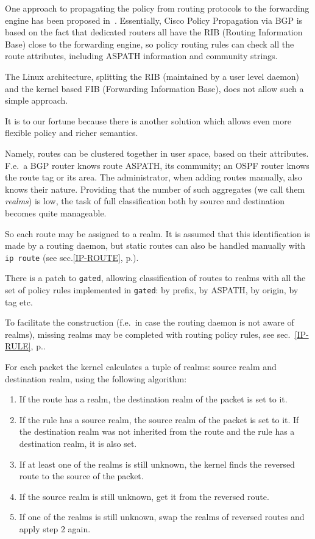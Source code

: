 One approach to propagating the policy from routing protocols
to the forwarding engine has been proposed in~\cite{IOS-BGP-PP}.
Essentially, Cisco Policy Propagation via BGP is based on the fact
that dedicated routers all have the RIB (Routing Information Base)
close to the forwarding engine, so policy routing rules can
check all the route attributes, including ASPATH information
and community strings.

The Linux architecture, splitting the RIB (maintained by a user level
daemon) and the kernel based FIB (Forwarding Information Base),
does not allow such a simple approach.

It is to our fortune because there is another solution
which allows even more flexible policy and richer semantics.

Namely, routes can be clustered together in user space, based on their
attributes.  F.e.\ a BGP router knows route ASPATH, its community;
an OSPF router knows the route tag or its area. The administrator, when adding
routes manually, also knows their nature. Providing that the number of such
aggregates (we call them {\em realms\/}) is low, the task of full
classification both by source and destination becomes quite manageable.

So each route may be assigned to a realm. It is assumed that
this identification is made by a routing daemon, but static routes
can also be handled manually with \verb|ip route| (see sec.\ref{IP-ROUTE},
p.\pageref{IP-ROUTE}).
\begin{NB}
  There is a patch to \verb|gated|, allowing classification of routes
  to realms with all the set of policy rules implemented in \verb|gated|:
  by prefix, by ASPATH, by origin, by tag etc.
\end{NB}

To facilitate the construction (f.e.\ in case the routing
daemon is not aware of realms), missing realms may be completed
with routing policy rules, see sec.~\ref{IP-RULE}, p.\pageref{IP-RULE}.

For each packet the kernel calculates a tuple of realms: source realm
and destination realm, using the following algorithm:

\begin{enumerate}
\item If the route has a realm, the destination realm of the packet is set to it.
\item If the rule has a source realm, the source realm of the packet is set to it.
If the destination realm was not inherited from the route and the rule has a destination realm,
it is also set.
\item If at least one of the realms is still unknown, the kernel finds
the reversed route to the source of the packet.
\item If the source realm is still unknown, get it from the reversed route.
\item If one of the realms is still unknown, swap the realms of reversed
routes and apply step 2 again.
\end{enumerate}

